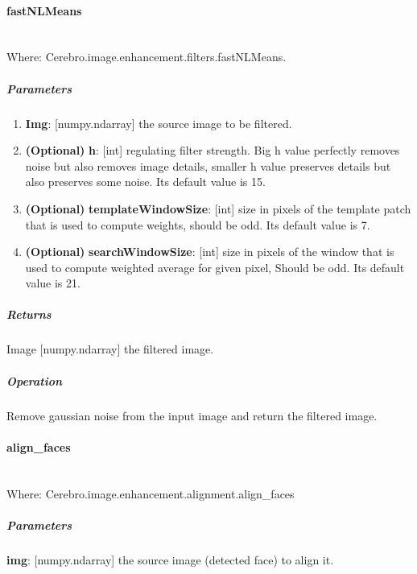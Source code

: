 \paragraph{fastNLMeans} \mbox{} \\
Where: Cerebro.image.enhancement.filters.fastNLMeans.
\subparagraph{Parameters}
\begin{changemargin}{0.5cm}{0cm}
	\begin{enumerate} 
		\item \textbf{Img}: [numpy.ndarray] the source image to be filtered.
		\item \textbf{(Optional)} \textbf{h}: [int] regulating filter strength. Big h value perfectly removes noise but also removes image details, smaller h value preserves details but also preserves some noise. Its default value is 15.
		\item \textbf{(Optional)} \textbf{templateWindowSize}: [int] size in pixels of the template patch that is used to compute weights, should be odd. \newline Its default value is 7.
		\item \textbf{(Optional)} \textbf{searchWindowSize}: [int] size in pixels of the window that is used to compute weighted average for given pixel, Should be odd. \newline Its default value is 21.
	\end{enumerate}
\end{changemargin}

\subparagraph{Returns}
\begin{changemargin}{1cm}{0cm}
	Image [numpy.ndarray] the filtered image.
\end{changemargin}

\subparagraph{Operation}
\begin{changemargin}{1cm}{0cm}
	Remove gaussian noise from the input image and return the filtered image.
\end{changemargin}


\paragraph{align\_faces} \mbox{} \\
Where: Cerebro.image.enhancement.alignment.align\_faces
\subparagraph{Parameters}
\begin{changemargin}{1cm}{0cm}
	\textbf{img}: [numpy.ndarray] the source image (detected face) to align it.
\end{changemargin}

